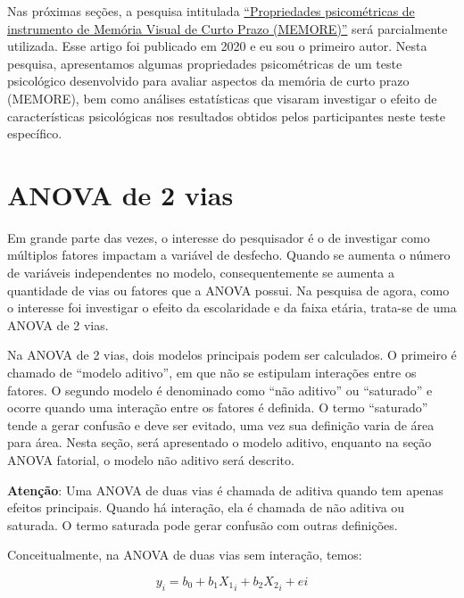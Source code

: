 \documentclass[
]{book}
\begin{document}
Nas próximas seções, a pesquisa intitulada
\href{https://www.neuropsicolatina.org/index.php/Neuropsicologia_Latinoamericana/article/view/545}{``Propriedades
psicométricas de instrumento de Memória Visual de Curto Prazo
(MEMORE)''} será parcialmente utilizada. Esse artigo foi publicado em
2020 e eu sou o primeiro autor. Nesta pesquisa, apresentamos algumas
propriedades psicométricas de um teste psicológico desenvolvido para
avaliar aspectos da memória de curto prazo (MEMORE), bem como análises
estatísticas que visaram investigar o efeito de características
psicológicas nos resultados obtidos pelos participantes neste teste
específico.

\hypertarget{anova-de-2-vias}{%
\section{ANOVA de 2 vias}\label{anova-de-2-vias}}

Em grande parte das vezes, o interesse do pesquisador é o de investigar
como múltiplos fatores impactam a variável de desfecho. Quando se
aumenta o número de variáveis independentes no modelo, consequentemente
se aumenta a quantidade de vias ou fatores que a ANOVA possui. Na
pesquisa de agora, como o interesse foi investigar o efeito da
escolaridade e da faixa etária, trata-se de uma ANOVA de 2 vias.

Na ANOVA de 2 vias, dois modelos principais podem ser calculados. O
primeiro é chamado de ``modelo aditivo'', em que não se estipulam
interações entre os fatores. O segundo modelo é denominado como ``não
aditivo'' ou ``saturado'' e ocorre quando uma interação entre os fatores
é definida. O termo ``saturado'' tende a gerar confusão e deve ser
evitado, uma vez sua definição varia de área para área. Nesta seção,
será apresentado o modelo aditivo, enquanto na seção ANOVA fatorial, o
modelo não aditivo será descrito.

\begin{warning}

\textbf{Atenção}: Uma ANOVA de duas vias é chamada de aditiva quando tem
apenas efeitos principais. Quando há interação, ela é chamada de não
aditiva ou saturada. O termo saturada pode gerar confusão com outras
definições.

\end{warning}

Conceitualmente, na ANOVA de duas vias sem interação, temos:

\[y_i = b_0 + b_1X{_1}_i + b_2X{_2}_i + ei\]
\end{document}
